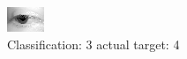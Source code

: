 \begin{figure}[h!]
\begin{center}
\includegraphics[width=0.60\columnwidth]{figures/ID2572_class_3_target_4.png}
\end{center}
\caption{ Classification: 3 actual target: 4}
\label{fig:ID2572_class_3_target_4}
\end{figure}
